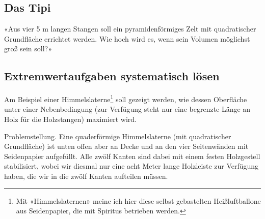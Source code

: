 
\newpage
\subsection{Das Tipi}


«Aus vier 5 m langen Stangen soll ein pyramidenförmiges Zelt mit quadratischer Grundfläche errichtet werden.
Wie hoch wird es, wenn sein Volumen möglichst groß sein soll?»



\subsection{Extremwertaufgaben systematisch lösen}
Am Beispiel einer Himmelslaterne\footnote{Mit «Himmelslaternen» meine ich hier diese selbst gebastelten Heißluftballone aus Seidenpapier, die mit Spiritus betrieben werden.} soll gezeigt werden, wie dessen Oberfläche unter einer Nebenbedingung (zur Verfügung steht nur eine begrenzte Länge an Holz für die Holzstangen) maximiert wird.

Problemstellung. Eine quaderförmige Himmelslaterne (mit quadratischer
Grundfläche) ist unten offen aber an Decke und an den vier Seitenwänden mit Seidenpapier aufgefüllt. Alle zwölf Kanten sind dabei mit einem festen Holzgestell stabilisiert, wobei wir diesmal nur eine acht Meter lange Holzleiste zur Verfügung haben, die wir in die zwölf Kanten aufteilen müssen.


